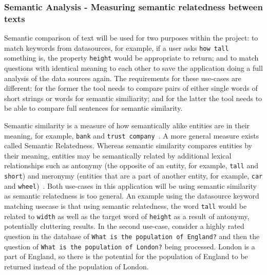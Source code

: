 \documentclass[authoryearcitations]{UoYCSproject}
\begin{document}

\subsubsection{Semantic Analysis - Measuring semantic relatedness between texts}
\label{sec:choosingSemanticAnalysisApi}
Semantic comparison of text will be used for two purposes within the project: to match keywords from datasources, for example, if a user asks \texttt{how tall} something is, the property \texttt{height} would be appropriate to return; and to match questions with identical meaning to each other to save the application doing a full analysis of the data sources again. The requirements for these use-cases are different: for the former the tool needs to compare pairs of either single words of short strings or words for semantic similiarity; and for the latter the tool needs to be able to compare full sentences for semantic similarity.

Semantic similarity is a measure of how semantically alike entities are in their meaning, for example, \texttt{bank} and \texttt{trust company}~\cite{Budanitsky:2006:EWM:1168106.1168108}. A more general measure exists called Semantic Relatedness. Whereas semantic similarity compares entities by their meaning, entities may be semantically related by additional lexical relationships such as antonymy (the opposite of an entity, for example, \texttt{tall} and \texttt{short}) and meronymy (entities that are a part of another entity, for example, \texttt{car} and \texttt{wheel})~\cite{Budanitsky:2006:EWM:1168106.1168108, budanitsky2001semantic}. Both use-cases in this application will be using semantic similarity as semantic relatedness is too general. An example using the datasource keyword matching usecase is that using semantic relatedness, the word \texttt{tall} would be related to \texttt{width} as well as the target word of \texttt{height} as a result of antonymy, potentially cluttering results. In the second use-case, consider a highly rated question in the database of \texttt{What is the population of England?} and then the question of \texttt{What is the population of London?} being processed. London is a part of England, so there is the potential for the population of England to be returned instead of the population of London.
\end{document}
